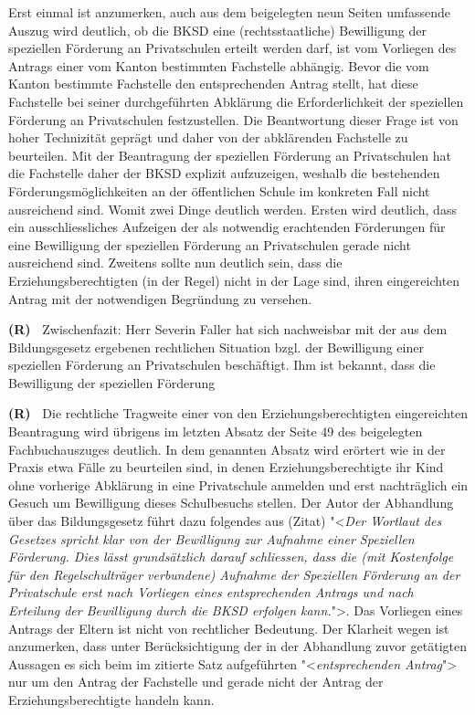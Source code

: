 \documentclass[paper=a4,fontsize=12pt, oneside, numbers=noenddot]{scrbook}
\newcounter{rz}
\newcommand{\Rz}{
	\addtocounter{rz}{1}\textbf{(R\arabic{rz})~}
}
\newcommand{\RzLabel}[1]{
	\refstepcounter{rz}\label{#1}\textbf{(R\arabic{rz})~}
}
\begin{document}
Erst einmal ist anzumerken, auch aus dem beigelegten neun Seiten umfassende Auszug wird deutlich, ob die BKSD eine (rechtsstaatliche) Bewilligung der speziellen Förderung an Privatschulen erteilt werden darf, ist vom Vorliegen des Antrags einer vom Kanton bestimmten Fachstelle abhängig. Bevor die vom Kanton bestimmte Fachstelle den entsprechenden Antrag stellt, hat diese Fachstelle bei seiner durchgeführten Abklärung die Erforderlichkeit der speziellen Förderung an Privatschulen festzustellen. Die Beantwortung dieser Frage ist von hoher Technizität geprägt und daher von der abklärenden Fachstelle zu beurteilen. Mit der Beantragung der speziellen Förderung an Privatschulen hat die Fachstelle daher der BKSD explizit aufzuzeigen, weshalb die bestehenden Förderungsmöglichkeiten an der öffentlichen Schule im konkreten Fall nicht ausreichend sind. Womit zwei Dinge deutlich werden. Ersten wird deutlich, dass ein ausschliessliches Aufzeigen der als notwendig erachtenden Förderungen für eine Bewilligung der speziellen Förderung an Privatschulen gerade nicht ausreichend sind. Zweitens sollte nun deutlich sein, dass die Erziehungsberechtigten (in der Regel) nicht in der Lage sind, ihren eingereichten Antrag mit der notwendigen Begründung zu versehen.

\RzLabel{arg1} Zwischenfazit: Herr Severin Faller hat sich nachweisbar mit der aus dem Bildungsgesetz ergebenen rechtlichen Situation bzgl. der Bewilligung einer speziellen Förderung an Privatschulen beschäftigt. Ihm ist bekannt, dass die Bewilligung der speziellen Förderung


\Rz Die rechtliche Tragweite einer von den Erziehungsberechtigten eingereichten Beantragung wird übrigens im letzten Absatz der Seite 49 des beigelegten Fachbuchauszuges deutlich. In dem genannten Absatz wird erörtert wie in der Praxis etwa Fälle zu beurteilen sind, in denen Erziehungsberechtigte ihr Kind ohne vorherige Abklärung in eine Privatschule anmelden und erst nachträglich ein Gesuch um Bewilligung dieses Schulbesuchs stellen. Der Autor der Abhandlung über das Bildungsgesetz führt dazu folgendes aus (Zitat) "<\textit{Der Wortlaut des Gesetzes spricht klar von der Bewilligung zur Aufnahme einer Speziellen Förderung. Dies lässt grundsätzlich darauf schliessen, dass die (mit Kostenfolge für den Regelschulträger verbundene) Aufnahme der Speziellen Förderung an der Privatschule erst nach Vorliegen eines entsprechenden Antrags und nach Erteilung der Bewilligung durch die BKSD erfolgen kann.}">. Das Vorliegen eines Antrags der Eltern ist nicht von rechtlicher Bedeutung. Der Klarheit wegen ist anzumerken, dass unter Berücksichtigung der in der Abhandlung zuvor getätigten Aussagen es sich beim im zitierte Satz aufgeführten "<\textit{entsprechenden Antrag}"> nur um den Antrag der Fachstelle und gerade nicht der Antrag der Erziehungsberechtigte handeln kann.
\end{document}

